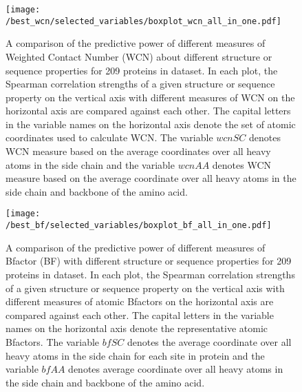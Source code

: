 \documentclass[11pt]{article}
\begin{document}
    \begin{figure}[tbh]
        \begin{center}
        \texttt{[image: /best\_wcn/selected\_variables/boxplot\_wcn\_all\_in\_one.pdf]}
        \end{center}
        \caption{A comparison of the predictive power of different measures of Weighted Contact Number (WCN) about different structure or sequence properties for 209 proteins in dataset. In each plot, the Spearman correlation strengths of a given structure or sequence property on the vertical axis with different measures of WCN on the horizontal axis are compared against each other. The capital letters in the variable names on the horizontal axis denote the set of atomic coordinates used to calculate WCN. The variable $wcnSC$ denotes WCN measure based on the average coordinates over all heavy atoms in the side chain and the variable $wcnAA$ denotes WCN measure based on the average coordinate over all heavy atoms in the side chain and backbone of the amino acid.}
        \label{fig:best_wcn}
    \end{figure}

    \begin{figure}[tbh]
        \begin{center}
        \texttt{[image: /best\_bf/selected\_variables/boxplot\_bf\_all\_in\_one.pdf]}
        \end{center}
        \caption{A comparison of the predictive power of different measures of Bfactor (BF) with different structure or sequence properties for 209 proteins in dataset. In each plot, the Spearman correlation strengths of a given structure or sequence property on the vertical axis with different measures of atomic Bfactors on the horizontal axis are compared against each other. The capital letters in the variable names on the horizontal axis denote the representative atomic Bfactors. The variable $bfSC$ denotes the average coordinate over all heavy atoms in the side chain for each site in protein and the variable $bfAA$ denotes average coordinate over all heavy atoms in the side chain and backbone of the amino acid.}
        \label{fig:best_bf}
    \end{figure}
\end{document}
